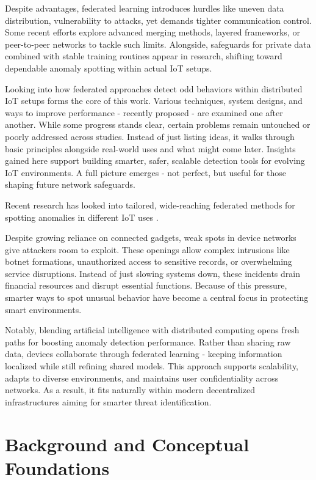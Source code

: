 \documentclass[12pt]{article}
\begin{document}
Despite advantages, federated learning introduces hurdles like uneven data distribution, vulnerability to attacks, yet demands tighter communication control. Some recent efforts explore advanced merging methods, layered frameworks, or peer-to-peer networks to tackle such limits. Alongside, safeguards for private data combined with stable training routines appear in research, shifting toward dependable anomaly spotting within actual IoT setups.

Looking into how federated approaches detect odd behaviors within distributed IoT setups forms the core of this work. Various techniques, system designs, and ways to improve performance - recently proposed - are examined one after another. While some progress stands clear, certain problems remain untouched or poorly addressed across studies. Instead of just listing ideas, it walks through basic principles alongside real-world uses and what might come later. Insights gained here support building smarter, safer, scalable detection tools for evolving IoT environments. A full picture emerges - not perfect, but useful for those shaping future network safeguards.

Recent research has looked into tailored, wide-reaching federated methods for spotting anomalies in different IoT uses \cite{paper14,paper15,paper16}.

Despite growing reliance on connected gadgets, weak spots in device networks give attackers room to exploit. These openings allow complex intrusions like botnet formations, unauthorized access to sensitive records, or overwhelming service disruptions. Instead of just slowing systems down, these incidents drain financial resources and disrupt essential functions. Because of this pressure, smarter ways to spot unusual behavior have become a central focus in protecting smart environments.

Notably, blending artificial intelligence with distributed computing opens fresh paths for boosting anomaly detection performance. Rather than sharing raw data, devices collaborate through federated learning - keeping information localized while still refining shared models. This approach supports scalability, adapts to diverse environments, and maintains user confidentiality across networks. As a result, it fits naturally within modern decentralized infrastructures aiming for smarter threat identification.


	\section{Background and Conceptual Foundations}
	
\end{document}
